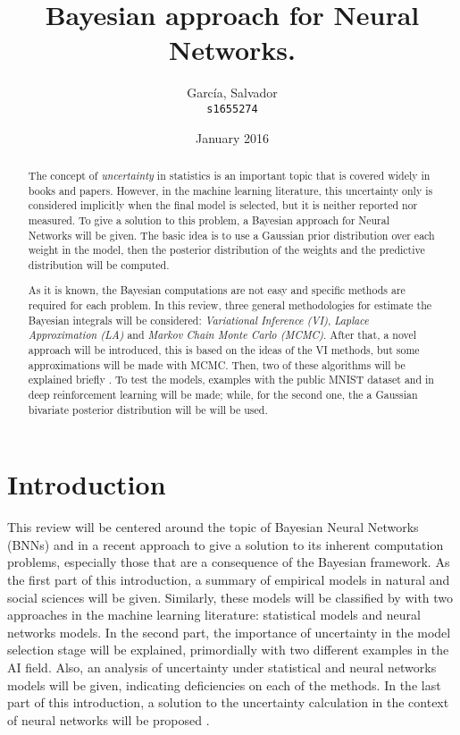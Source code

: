 \documentclass{article}
\title{Bayesian approach for Neural Networks.}
\author{García, Salvador\\
  \texttt{s1655274}}
\date{January 2016}
\begin{document}
\maketitle
\tableofcontents


\newpage
\begin{abstract}
The concept of \textit{uncertainty} in statistics is an important topic that is covered widely in books and papers. However, in the machine learning literature, this uncertainty only is considered implicitly when the final model is selected, but it is neither reported nor measured. To give a solution to this problem, a Bayesian approach for Neural Networks will be given. The basic idea is to use a Gaussian prior distribution over each weight in the model, then the posterior distribution of the weights and the predictive distribution will be computed.

As it is known, the Bayesian computations are not easy and specific methods are required for each problem. In this review, three general methodologies for estimate the Bayesian integrals will be considered: \textit{Variational Inference (VI)}, \textit{Laplace Approximation (LA)} and \textit{Markov Chain Monte Carlo (MCMC)}. After that, a novel approach will be introduced, this is based on the ideas of the VI methods, but some approximations will be made with MCMC. Then, two of these algorithms will be explained briefly \cite{gal2016uncertainty} \cite{salimans2015markov}. To test the models, examples with the public MNIST dataset and in deep reinforcement learning will be made; while, for the second one, the a Gaussian bivariate posterior distribution will be \cite{lecun2010mnist} will be used.
\end{abstract}

\newpage

\section{Introduction}

This review will be centered around the topic of Bayesian Neural Networks (BNNs) and in a recent approach to give a solution to its inherent computation problems, especially those that are a consequence of the Bayesian framework. As the first part of this introduction, a summary of empirical models in natural and social sciences will be given. Similarly, these models will be classified by with two approaches in the machine learning literature: statistical models and neural networks models. In the second part, the importance of uncertainty in the model selection stage will be explained, primordially with two different examples in the AI field. Also, an analysis of uncertainty under statistical and neural networks models will be given, indicating deficiencies on each of the methods. In the last part of this introduction, a solution to the uncertainty calculation in the context of neural networks will be proposed \cite{gal2016uncertainty} \cite{salimans2015markov} \cite{bishop2006pattern}.
\end{document}
